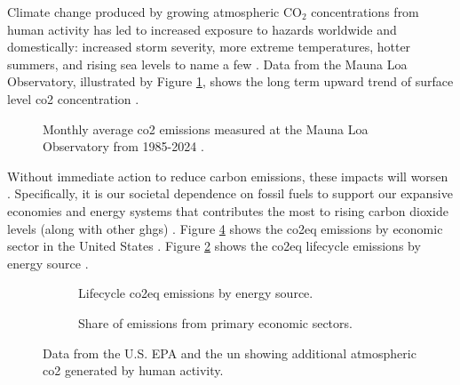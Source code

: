 Climate change produced by growing atmospheric CO$_2$ concentrations
\cite{kane_atmospheric_1996} from human activity has led to increased exposure
to hazards worldwide and domestically: increased storm severity, more extreme
temperatures, hotter summers, and rising sea levels to name a few
\cite{reidmiller_fourth_2018}. Data from the Mauna Loa Observatory, illustrated
by Figure \ref{fig:mauna-loa-co2}, shows the long term upward trend of surface
level \ac{co2} concentration \cite{kane_atmospheric_1996}.
\begin{figure}[ht!]
    \centering
    \resizebox{0.9\columnwidth}{!}{}
    \caption{Monthly average \ac{co2} emissions measured at the Mauna Loa
    Observatory from 1985-2024 \cite{kane_atmospheric_1996}.}
    \label{fig:mauna-loa-co2}
\end{figure}

Without immediate action to reduce carbon emissions, these impacts will worsen
\cite{intergovernmental_panel_on_climate_change_climate_2014}. Specifically, it
is our societal dependence on fossil fuels to support our expansive economies
and energy systems that contributes the most to rising carbon dioxide levels
(along with other \acp{ghg}) \cite{epa_inventory_2023}. Figure
\ref{fig:emissions-by-sector} shows the \ac{co2eq} emissions by economic sector
in the United States \cite{epa_inventory_2023}. Figure
\ref{fig:emissions-by-source} shows the \ac{co2eq} lifecycle emissions by energy
source \cite{united_nations_economic_commission_for_europe_carbon_2022}. 

\begin{figure}[ht!]
    \centering
    \begin{subfigure}{0.7\columnwidth}
        \centering
        \resizebox{\textwidth}{!}{}
        \caption{Lifecycle \ac{co2eq} emissions by energy source.}
        \label{fig:emissions-by-source}
    \end{subfigure}
    \begin{subfigure}{0.7\columnwidth}
        \centering
        \resizebox{\textwidth}{!}{}
        \caption{Share of emissions from primary economic sectors.}
        \label{fig:emissions-by-sector}
    \end{subfigure}
    \caption{Data from the U.S. EPA and the \ac{un} showing additional
    atmospheric \ac{co2} generated by human activity.}
\end{figure}
\FloatBarrier

